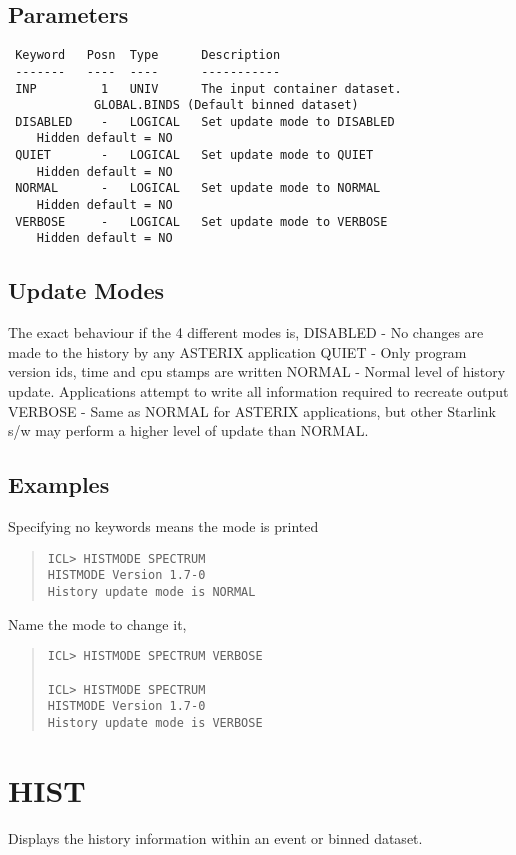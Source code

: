 \documentclass{book}
\renewcommand{\_}{{\tt\char'137}}     %
\begin{document}
\subsection{Parameters}
\begin{verbatim}
 Keyword   Posn  Type      Description
 -------   ----  ----      -----------
 INP         1   UNIV      The input container dataset.
            GLOBAL.BINDS (Default binned dataset)
 DISABLED    -   LOGICAL   Set update mode to DISABLED
    Hidden default = NO
 QUIET       -   LOGICAL   Set update mode to QUIET
    Hidden default = NO
 NORMAL      -   LOGICAL   Set update mode to NORMAL
    Hidden default = NO
 VERBOSE     -   LOGICAL   Set update mode to VERBOSE
    Hidden default = NO

\end{verbatim}\subsection{Update Modes}
The exact behaviour if the 4 different modes is,
DISABLED - No changes are made to the history by
any ASTERIX application
QUIET - Only program version ids, time and cpu
stamps are written
NORMAL - Normal level of history update.
Applications attempt to write all
information required to recreate output
VERBOSE - Same as NORMAL for ASTERIX applications,
but other Starlink s/w may perform a
higher level of update than NORMAL.
\subsection{Examples}
Specifying no keywords means the mode is printed

\begin{quote}\begin{verbatim}
ICL> HISTMODE SPECTRUM
HISTMODE Version 1.7-0
History update mode is NORMAL
\end{verbatim}\end{quote}
Name the mode to change it,

\begin{quote}\begin{verbatim}
ICL> HISTMODE SPECTRUM VERBOSE

ICL> HISTMODE SPECTRUM
HISTMODE Version 1.7-0
History update mode is VERBOSE
\end{verbatim}\end{quote}
\section{HIST}
Displays the history information within an event or binned
dataset.
\end{document}
